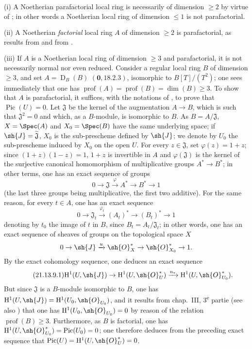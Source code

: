 \begin{example}[21.13.9]
\label{IV.21.13.9}
(i) A Noetherian parafactorial local ring is necessarily of dimension $\geq 2$ by virtue of ; in other words a Noetherian local ring of dimension $\leq 1$ is not parafactorial.

(ii) A Noetherian \emph{factorial} local ring $A$ of dimension $\geq 2$ is parafactorial, as results from  and from .

(iii) If $A$ is a Noetherian local ring of dimension $\geq 3$ and parafactorial, it is not necessarily normal nor even reduced.
Consider a regular local ring $B$ of dimension $\geq 3$, and set $A=\operatorname{D}_B(B)$ $(\mathbf{0}, 18.2.3)$, isomorphic to $B[T]/(T^2)$; one sees immediately that one has $\operatorname{prof}(A)=\operatorname{prof}(B)=\dim(B)\geq 3$.
To show that $A$ is parafactorial, it suffices, with the notations of , to prove that $\operatorname{Pic}(U)=0$.
Let $\mathfrak{J}$ be the kernel of the augmentation $A\to B$, which is such that $\mathfrak{J}^2=0$ and which, as a $B$-module, is isomorphic to $B$.
As $B=A/\mathfrak{J}$, $X=\Spec(A)$ and $X_0=\Spec(B)$ have the same underlying space; if $\sh{J}=\widetilde{\mathfrak{J}}$, $X_0$ is the sub-prescheme defined by $\sh{J}$; we denote by $U_0$ the sub-prescheme induced by $X_0$ on the open $U$.
For every $z\in\mathfrak{J}$, set $\varphi(z)=1+z$; since $(1+z)(1-z)=1$, $1+z$ is invertible in $A$ and $\varphi(\mathfrak{J})$ is the kernel of the surjective canonical homomorphism of multiplicative groups $A^*\to B^*$; in other terms, one has an exact sequence of groups
\[
  0\to\mathfrak{J}\xrightarrow{\varphi}A^*\to B^*\to 1
\]
(the last three groups being multiplicative, the first two additive).
For the same reason, for every $t\in A$, one has an exact sequence
\[
  0\to\mathfrak{J}_t\xrightarrow{\varphi_t}(A_t)^*\to(B_t)^*\to 1
\]
denoting by $t_0$ the image of $t$ in $B$, since $B_t=A_t/\mathfrak{J}_t$; in other words, one has an exact sequence of sheaves of groups on the topological space $X$
\[
  0\to\sh{J}\xrightarrow{u}\sh{O}_X^*\to\sh{O}_{X_0}^*\to 1.
\]
By the exact cohomology sequence, one deduces an exact sequence
\begin{equation*}
\tag{21.13.9.1}
  \mathrm{H}^1(U,\sh{J})\to\mathrm{H}^1(U,\sh{O}_U^*)\xrightarrow{u_*}\mathrm{H}^1(U,\sh{O}_{U_0}^*).
\end{equation*}
But since $\mathfrak{J}$ is a $B$-module isomorphic to $B$, one has $\mathrm{H}^1(U,\sh{J})=\mathrm{H}^1(U_0,\sh{O}_{U_0})$, and it results from chap.~III, 3\textsuperscript{e} partie (see also \cite[III, Exemple III-1]{41}) that one has
$\mathrm{H}^1(U_0,\sh{O}_{U_0})=0$ by reason of the relation $\operatorname{prof}(B)\geq 3$.
Furthermore, as $B$ is factorial, one has $\mathrm{H}^1(U,\sh{O}_{U_0}^*)=\operatorname{Pic}(U_0)=0$; one therefore deduces from the preceding exact sequence that $\operatorname{Pic}(U)=\mathrm{H}^1(U,\sh{O}_U^*)=0$.


\end{example}
